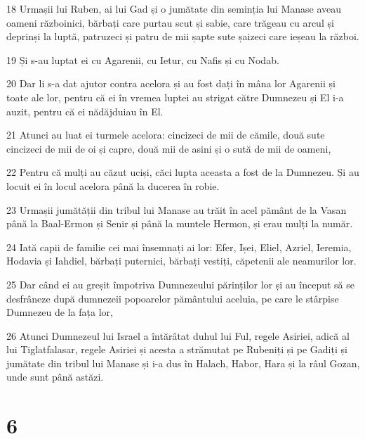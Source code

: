 \par 18 Urmașii lui Ruben, ai lui Gad și o jumătate din seminția lui Manase aveau oameni războinici, bărbați care purtau scut și sabie, care trăgeau cu arcul și deprinși la luptă, patruzeci și patru de mii șapte sute șaizeci care ieșeau la război.
\par 19 Și s-au luptat ei cu Agarenii, cu Ietur, cu Nafis și cu Nodab.
\par 20 Dar li s-a dat ajutor contra acelora și au fost dați în mâna lor Agarenii și toate ale lor, pentru că ei în vremea luptei au strigat către Dumnezeu și El i-a auzit, pentru că ei nădăjduiau în El.
\par 21 Atunci au luat ei turmele acelora: cincizeci de mii de cămile, două sute cincizeci de mii de oi și capre, două mii de asini și o sută de mii de oameni,
\par 22 Pentru că mulți au căzut uciși, căci lupta aceasta a fost de la Dumnezeu. Și au locuit ei în locul acelora până la ducerea în robie.
\par 23 Urmașii jumătății din tribul lui Manase au trăit în acel pământ de la Vasan până la Baal-Ermon și Senir și până la muntele Hermon, și erau mulți la număr.
\par 24 Iată capii de familie cei mai însemnați ai lor: Efer, Ișei, Eliel, Azriel, Ieremia, Hodavia și Iahdiel, bărbați puternici, bărbați vestiți, căpetenii ale neamurilor lor.
\par 25 Dar când ei au greșit împotriva Dumnezeului părinților lor și au început să se desfrâneze după dumnezeii popoarelor pământului aceluia, pe care le stârpise Dumnezeu de la fața lor,
\par 26 Atunci Dumnezeul lui Israel a întărâtat duhul lui Ful, regele Asiriei, adică al lui Tiglatfalasar, regele Asiriei și acesta a strămutat pe Rubeniți și pe Gadiți și jumătate din tribul lui Manase și i-a dus în Halach, Habor, Hara și la râul Gozan, unde sunt până astăzi.

\chapter{6}

